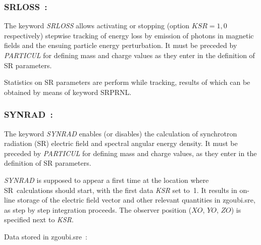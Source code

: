 \subsubsection*{SRLOSS~: \SRLOSSTitl\ } \label{SRLOSS}
\cite{FMSEA-00-01}

\noindent The keyword \textsl{SRLOSS} allows activating or stopping (option $KSR=1,0$ respectively) 
 stepwise tracking  of energy loss by emission of 
photons in magnetic fields and the ensuing particle energy perturbation. It must be
preceded by \textsl{PARTICUL} for defining  mass and charge values as they enter in the 
definition of SR parameters. 


\bigskip

Statistics on SR parameters are perform while tracking, results of which can be obtained by means of keyword 
 SRPRNL. 


\newpage

\subsubsection*{SYNRAD~: \SYNRADTitl}\label{SYNRAD}

\noindent The keyword \textsl{SYNRAD} enables (or disables) the calculation of 
synchrotron radiation (SR) electric field and spectral angular energy density. It must be 
preceded by \textsl{PARTICUL} for defining  mass and charge values, as they enter 
in the definition of SR parameters. 

\bigskip

\noindent\textsl{SYNRAD} is supposed to appear a first time at the 
location where SR~calculations should start, with the first data \textsl{KSR} set 
to~1. It results in on-line storage of the electric field vector and 
other relevant quantities in zgoubi.sre, as step by step integration 
proceeds. The observer position ($XO$, $YO$, $ZO$) is specified next 
to \textsl{KSR}.
\bigskip

\noindent Data stored in zgoubi.sre~:
 
